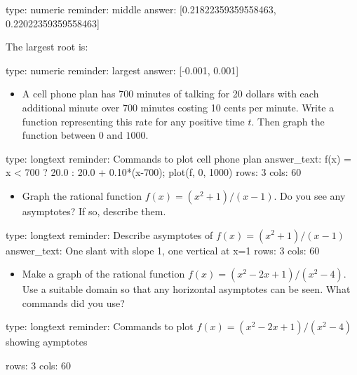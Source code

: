 \documentclass[12pt]{article}
\begin{document}
\begin{answer}
    type: numeric
    reminder: middle
    answer: [0.21822359359558463, 0.22022359359558463]

\end{answer}

The largest root is:

\begin{answer}
    type: numeric
    reminder: largest
    answer: [-0.001, 0.001]

\end{answer}

\begin{itemize}
\itemsep1pt\parskip0pt
\item
  A cell phone plan has 700 minutes of talking for 20 dollars with each
  additional minute over 700 minutes costing 10 cents per minute. Write
  a function representing this rate for any positive time $t$. Then
  graph the function between $0$ and $1000$.
\end{itemize}

\begin{answer}
type: longtext
reminder: Commands to plot cell phone plan
answer_text: f(x) = x < 700 ? 20.0  : 20.0 + 0.10*(x-700); plot(f, 0, 1000) 
rows: 3
cols: 60
\end{answer}

\begin{itemize}
\itemsep1pt\parskip0pt
\item
  Graph the rational function $f(x) = (x^2 + 1)/ (x - 1)$. Do you see
  any asymptotes? If so, describe them.
\end{itemize}

\begin{answer}
type: longtext
reminder: Describe asymptotes of \(f(x) = (x^2 + 1)/ (x - 1) \)
answer_text: One slant with slope 1, one vertical at x=1 
rows: 3
cols: 60
\end{answer}

\begin{itemize}
\itemsep1pt\parskip0pt
\item
  Make a graph of the rational function
  $f(x) = (x^2 - 2x + 1)/(x^2 -   4)$. Use a suitable domain so that any
  horizontal asymptotes can be seen. What commands did you use?
\end{itemize}

\begin{answer}
type: longtext
reminder: Commands to plot \( f(x) = (x^2 - 2x + 1)/(x^2 - 4) \) showing aymptotes

rows: 3
cols: 60
\end{answer}
\end{document}
